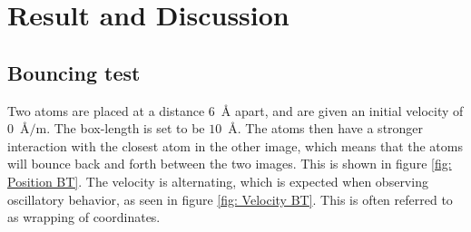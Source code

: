\documentclass[a4paper]{article}
\begin{document}
\section{Result and Discussion}

\subsection{Bouncing test}
Two atoms are placed at a distance $6$~Å apart, and are given an initial velocity of $0$~Å$/$m. The box-length is set to be $10$~Å.
The atoms then have a stronger interaction with the closest atom in the other image, which means that the atoms will bounce back and forth between the two images. This is shown in figure \ref{fig: Position BT}. The velocity is alternating, which is expected when observing oscillatory behavior, as seen in figure \ref{fig: Velocity BT}.
This is often referred to as wrapping of coordinates.
\end{document}
